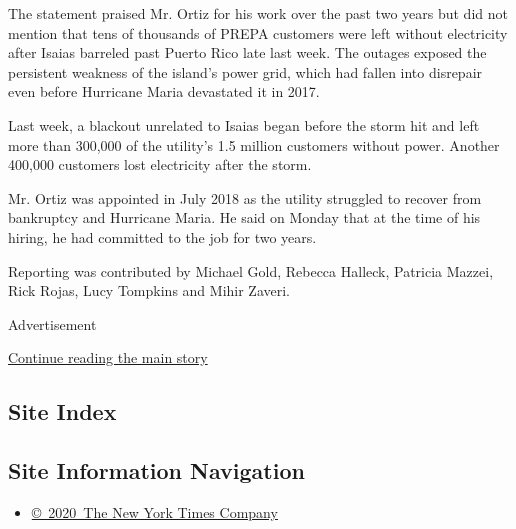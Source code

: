 The statement praised Mr. Ortiz for his work over the past two years but
did not mention that tens of thousands of PREPA customers were left
without electricity after Isaias barreled past Puerto Rico late last
week. The outages exposed the persistent weakness of the island's power
grid, which had fallen into disrepair even before Hurricane Maria
devastated it in 2017.

Last week, a blackout unrelated to Isaias began before the storm hit and
left more than 300,000 of the utility's 1.5 million customers without
power. Another 400,000 customers lost electricity after the storm.

Mr. Ortiz was appointed in July 2018 as the utility struggled to recover
from bankruptcy and Hurricane Maria. He said on Monday that at the time
of his hiring, he had committed to the job for two years.

Reporting was contributed by Michael Gold, Rebecca Halleck, Patricia
Mazzei, Rick Rojas, Lucy Tompkins and Mihir Zaveri.

Advertisement

\protect\hyperlink{after-bottom}{Continue reading the main story}

\hypertarget{site-index}{%
\subsection{Site Index}\label{site-index}}

\hypertarget{site-information-navigation}{%
\subsection{Site Information
Navigation}\label{site-information-navigation}}

\begin{itemize}
\tightlist
\item
  \href{https://help.nytimes3xbfgragh.onion/hc/en-us/articles/115014792127-Copyright-notice}{©~2020~The
  New York Times Company}
\end{itemize}

